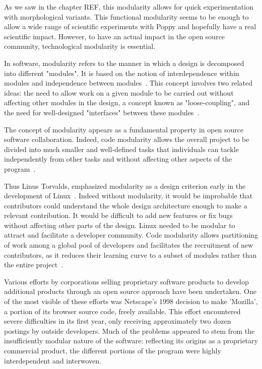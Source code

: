 As we saw in the chapter REF, this modularity allows for quick experimentation with morphological variants. This functional modularity seems to be enough to allow a wide range of scientific experiments with Poppy and hopefully have a real scientific impact. However, to have an actual impact in the open source community, technological modularity is essential.

In software, modularity refers to the manner in which a design is decomposed into different "modules". It is based on the notion of interdependence within modules and independence between modules~\parencite{baldwin2000design}. This concept involves two related ideas: the need to allow work on a given module to be carried out without affecting other modules in the design, a concept known as "loose-coupling", and the need for well-designed "interfaces" between these modules~\parencite{maccormack2006exploring}.

The concept of modularity appears as a fundamental property in open source software collaboration. Indeed, code modularity allows the overall project to be divided into much smaller and well-defined tasks that individuals can tackle independently from other tasks and without affecting other aspects of the program~\parencite{narduzzo2008modularity}.

Thus Linus Torvalds, emphasized modularity as a design criterion early in the development of Linux~\parencite{dibona1999open}. Indeed without modularity, it would be improbable that contributors could understand the whole design architecture enough to make a relevant contribution. It would be difficult to add new features or fix bugs without affecting other parts of the design. Linux needed to be modular to attract and facilitate a developer community. Code modularity allows partitioning of work among a global pool of developers and facilitates the recruitment of new contributors, as it reduces their learning curve to a subset of modules rather than the entire project~\parencite{fitzgerald2004critical}.

Various efforts by corporations selling proprietary software products to develop additional products through an open source approach have been undertaken. One of the most visible of these efforts was Netscape's 1998 decision to make 'Mozilla', a portion of its browser source code, freely available. This effort encountered severe difficulties in its first year, only receiving approximately two dozen postings by outside developers. Much of the problems appeared to stem from the insufficiently modular nature of the software: reflecting its origins as a proprietary commercial product, the different portions of the program were highly interdependent and interwoven.

